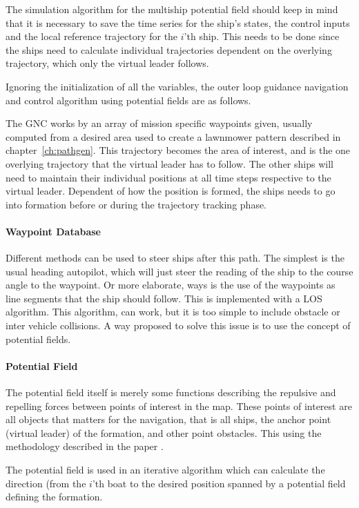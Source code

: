 The simulation algorithm for the multiship potential field should keep
in mind that it is necessary to save the time series for the ship's states, the control inputs and the local reference trajectory for the $i$'th ship. This needs to be done since the ships need to calculate individual trajectories dependent on the overlying trajectory, which only the virtual leader follows.

Ignoring the initialization of all the variables, the outer loop
guidance navigation and control algorithm using potential fields are
as follows.

The \ac{GNC} works by an array of mission specific waypoints given,
usually computed from a desired area used to create a lawnmower
pattern described in chapter~\vref{ch:pathgen}. This trajectory becomes the area of interest, and is the one overlying trajectory that the virtual leader has to follow. The other ships will need to maintain their individual positions at all time steps respective to the virtual leader. Dependent of how the position is formed, the ships needs to go into formation before or during the trajectory tracking phase.

\paragraph{Waypoint Database}
Different methods can be used to steer ships after this
path. The simplest is the usual heading autopilot, which will
just steer the reading of the ship to the course angle to the
waypoint. Or more elaborate, ways is the use of the waypoints as
line segments that the ship should follow. This is implemented with a
\ac{LOS} algorithm. This algorithm, can work, but it is too simple to
include obstacle or inter vehicle collisions. A way proposed to solve
this issue is to use the concept of potential fields.

\paragraph{Potential Field}
The potential field itself is merely some functions describing the
repulsive and repelling forces between points of interest in the map.
These points of interest are all objects that matters for the
navigation, that is all ships, the anchor point (virtual leader) of
the formation, and other point obstacles. This using the methodology
described in the paper \citep{UAVff3dpf}.

The potential field is used in an iterative algorithm which can
calculate the direction (from the $i$'th boat to the desired position
spanned by a potential field defining the formation.

